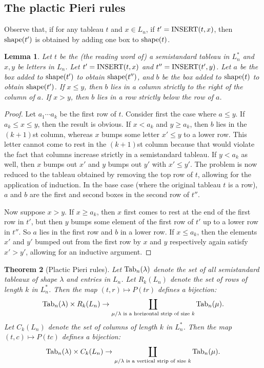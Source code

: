 \documentclass[11pt]{amsart}
\newtheorem{theorem}{Theorem}[subsection]
\newtheorem{lemma}[theorem]{Lemma}
\theoremstyle{definition}
\theoremstyle{example}
\newcommand{\ins}{\textup{INSERT}}
\newcommand{\shape}{\textup{shape}}
\newcommand{\Tab}{\textup{Tab}}
\begin{document}
\subsection{The plactic Pieri rules}
Observe that, if for any tableau $t$ and $x\in L_n$, if $t'=\ins(t,x)$, then $\shape(t')$ is obtained by adding one box to $\shape(t)$.
\begin{lemma}
  \label{lemma:two-step}
  Let $t$ be the (the reading word of) a semistandard tableau in $L_n^*$ and $x,y$ be letters in $L_n$.
  Let $t'=\ins(t,x)$ and $t''=\ins(t',y)$.
  Let $a$ be the box added to $\shape(t')$ to obtain $\shape(t'')$, and $b$ be the box added to $\shape(t)$ to obtain $\shape(t')$.
  If $x\leq y$, then $b$ lies in a column strictly to the right of the column of $a$.
  If $x>y$, then $b$ lies in a row strictly below the row of $a$.
\end{lemma}
\begin{proof}
  Let $a_1\dotsb a_k$ be the first row of $t$.
  Consider first the case where $a\leq y$.
  If $a_k\leq x\leq y$, then the result is obvious.
  If $x<a_k$ and $y\geq a_k$, then $b$ lies in the $(k+1)$st column, whereas $x$ bumps some letter $x'\leq y$ to a lower row.
  This letter cannot come to rest in the $(k+1)$st column because that would violate the fact that columns increase strictly in a semistandard tableau.
  If $y<a_k$ as well, then $x$ bumps out $x'$ and $y$ bumps out $y'$ with $x'\leq y'$.
  The problem is now reduced to the tableau obtained by removing the top row of $t$, allowing for the application of induction.
  In the base case (where the original tableau $t$ is a row), $a$ and $b$ are the first and second boxes in the second row of $t''$.

  Now suppose $x>y$.
  If $x\geq a_k$, then $x$ first comes to rest at the end of the first row in $t'$, but then $y$ bumps some element of the first row of $t'$ up to a lower row in $t''$.
  So $a$ lies in the first row and $b$ in a lower row.
  If $x\leq a_k$, then the elements $x'$ and $y'$ bumped out from the first row by $x$ and $y$ respectively again satisfy $x'>y'$, allowing for an inductive argument.
\end{proof}
\begin{theorem}
  [Plactic Pieri rules]
  \label{theorem:plactic-pieri}
  Let $\Tab_n(\lambda)$ denote the set of all semistandard tableaux of shape $\lambda$ and entries in $L_n$.
  Let $R_k(L_n)$ denote the set of rows of length $k$ in $L_n^*$.
  Then the map $(t,r)\mapsto P(tr)$ defines a bijection:
  \begin{displaymath}
    \Tab_n(\lambda)\times R_k(L_n) \to \coprod_{\mu/\lambda \text{ is a horizontal strip of size $k$}} \Tab_n(\mu).
  \end{displaymath}
  Let $C_k(L_n)$ denote the set of columns of length $k$ in $L_n^*$.
  Then the map $(t,c)\mapsto P(tc)$ defines a bijection:
  \begin{displaymath}
    \Tab_n(\lambda)\times C_k(L_n) \to \coprod_{\mu/\lambda \text{ is a vertical strip of size $k$}} \Tab_n(\mu).
  \end{displaymath}
\end{theorem}
\end{document}
